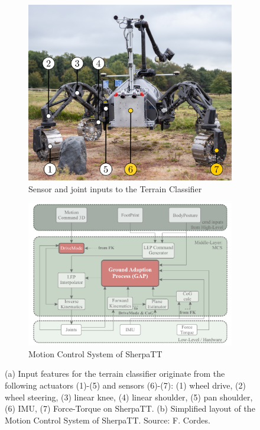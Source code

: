\documentclass{article}
\begin{document}
\begin{figure}[!htb]
    \begin{subfigure}[t]{0.44\textwidth}
        \includegraphics[width=\textwidth]{../figures/terrain_classifier_sensor_inputs.png}
        \caption{\label{fig:SensorInputs}Sensor and joint inputs to the Terrain Classifier}
    \end{subfigure}
    \begin{subfigure}[t]{0.55\textwidth}
        \includegraphics[width=\textwidth]{../figures/MCS-Structure.pdf}
        \caption{\label{fig:MCS}Motion Control System of SherpaTT \cite{cordes_phd_2018}}
    \end{subfigure}
     \caption{\label{fig:Loco}(a) Input features for the terrain classifier originate from the following actuators (1)-(5) and sensors (6)-(7): (1) wheel drive, (2) wheel steering, (3) linear knee, (4) linear shoulder, (5) pan shoulder, (6) IMU, (7) Force-Torque on SherpaTT. (b) Simplified layout of the Motion Control System of SherpaTT. Source: F. Cordes.}
\end{figure}
\end{document}
